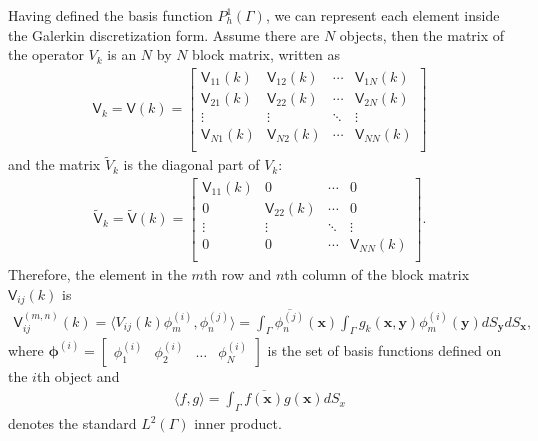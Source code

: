 Having defined the basis function $P_{h}^{1}(\Gamma)$, we can represent each element inside the Galerkin discretization form. Assume there are $N$ objects,
then the matrix of the operator $V_{k}$ is an $N$ by $N$ block matrix, written as 
\begin{align*}
    \mathsf{V}_{k} = \mathsf{V}(k) = \begin{bmatrix}
        \mathsf{V}_{11}(k) & \mathsf{V}_{12}(k) & \cdots & \mathsf{V}_{1N}(k) \\
        \mathsf{V}_{21}(k) & \mathsf{V}_{22}(k) & \cdots & \mathsf{V}_{2N}(k) \\
        \vdots & \vdots & \ddots & \vdots \\
        \mathsf{V}_{N1}(k) & \mathsf{V}_{N2}(k) & \cdots & \mathsf{V}_{NN}(k) \\
\end{bmatrix}
\end{align*}
and the matrix $\tilde{V}_{k}$ is the diagonal part of $V_{k}$:
\begin{align*}
    \tilde{\mathsf{V}}_{k} =  \tilde{\mathsf{V}}(k) = \begin{bmatrix}
        \mathsf{V}_{11}(k) & 0      & \cdots & 0 \\
    0      & \mathsf{V}_{22}(k) & \cdots & 0\\
    \vdots & \vdots & \ddots & \vdots \\
    0      & 0      & \cdots & \mathsf{V}_{NN}(k) \\
\end{bmatrix}.
\end{align*}
Therefore, the element in the $m$th row and $n$th column of the block matrix $\mathsf{V}_{ij}(k)$ is 
\begin{align}\label{Elements in matrix V}
    \mathsf{V}_{ij}^{(m,n)} (k) = \langle V_{ij}(k)\phi_{m}^{(i)}, \phi_{n}^{(j)}\rangle = 
    \int_{\Gamma}\overline{\phi_{n}^{(j)}}(\boldsymbol{x})\int_{\Gamma}g_{k}(\boldsymbol{x}, \boldsymbol{y})\phi_{m}^{(i)}(\boldsymbol{y})dS_{\boldsymbol{y}}dS_{\boldsymbol{x}},
\end{align}
where $\boldsymbol{\phi}^{(i)} = \begin{bmatrix}
    \phi_{1}^{(i)} & \phi_{2}^{(i)} & \dots & \phi_{N}^{(i)}
\end{bmatrix}$ is the set of basis functions defined on the $i$th object and 
\begin{align*}
    \langle f, g \rangle = \int_{\Gamma}\overline{f(\boldsymbol{x})}g(\boldsymbol{x})dS_{x}
\end{align*}
denotes the standard $L^{2}(\Gamma)$ inner product.


